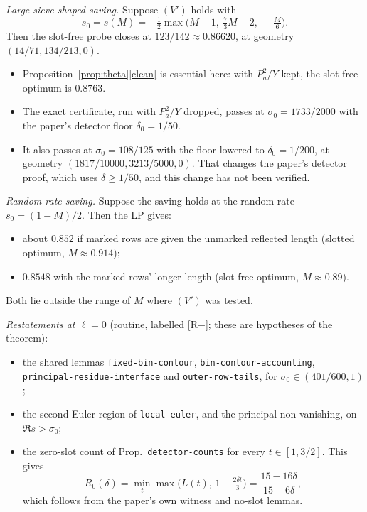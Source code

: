 \documentclass[11pt]{article}
\theoremstyle{definition}
\theoremstyle{remark}
\begin{document}
\noindent\emph{Large-sieve-shaped saving.} Suppose $(V')$ holds with
\[
s_0=s(M)=-\tfrac12\max\bigl(M-1,\ \tfrac73M-2,\ -\tfrac M6\bigr).
\]
Then the slot-free probe closes at $123/142\approx0.86620$, at geometry $(14/71,134/213,0)$.
\begin{itemize}[leftmargin=*]
\item Proposition~\ref{prop:theta}\ref{clean} is essential here: with $P_a^2/Y$ kept, the slot-free optimum is $0.8763$.
\item The exact certificate, run with $P_a^2/Y$ dropped, passes at $\sigma_0=1733/2000$ with the paper's detector floor $\delta_0=1/50$.
\item It also passes at $\sigma_0=108/125$ with the floor lowered to $\delta_0=1/200$, at geometry $(1817/10000,3213/5000,0)$. That changes the paper's detector proof, which uses $\delta\ge1/50$, and this change has not been verified.
\end{itemize}

\noindent\emph{Random-rate saving.} Suppose the saving holds at the random rate $s_0=(1-M)/2$. Then the LP gives:
\begin{itemize}[leftmargin=*]
\item about $0.852$ if marked rows are given the unmarked reflected length (slotted optimum, $M\approx0.914$);
\item $0.8548$ with the marked rows' longer length (slot-free optimum, $M\approx0.89$).
\end{itemize}
Both lie outside the range of $M$ where $(V')$ was tested.

\noindent\emph{Restatements at $\ell=0$} (routine, labelled [R$-$]; these are hypotheses of the theorem):
\begin{itemize}[leftmargin=*]
\item the shared lemmas \texttt{fixed-bin-contour}, \texttt{bin-contour-accounting}, \texttt{principal-residue-interface} and \texttt{outer-row-tails}, for $\sigma_0\in(401/600,1)$;
\item the second Euler region of \texttt{local-euler}, and the principal non-vanishing, on $\Re s>\sigma_0$;
\item the zero-slot count of Prop.~\texttt{detector-counts} for every $t\in[1,3/2]$. This gives
\[
R_0(\delta)=\min_t\max\bigl(L(t),\,1-\tfrac{2\delta t}{3}\bigr)=\frac{15-16\delta}{15-6\delta},
\]
which follows from the paper's own witness and no-slot lemmas.
\end{itemize}
\end{document}
